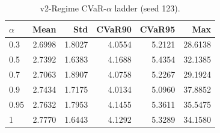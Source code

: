\begin{table}[H]
    \centering
    \caption{v2-Regime CVaR-$\alpha$ ladder (seed 123).}
    \label{tab:v2_regime_alpha}
    \begin{tabular}{@{}lrrrrr@{}}
        \toprule
        $\alpha$ & Mean & Std & CVaR90 & CVaR95 & Max \\
        \midrule
        0.3 & 2.6998 & 1.8027 & 4.0554 & 5.2121 & 28.6138 \\
        0.5 & 2.7392 & 1.6383 & 4.1688 & 5.4354 & 32.1385 \\
        0.7 & 2.7063 & 1.8907 & 4.0758 & 5.2267 & 29.1924 \\
        0.9 & 2.7434 & 1.7175 & 4.0134 & 5.0960 & 37.8852 \\
        0.95 & 2.7632 & 1.7953 & 4.1455 & 5.3611 & 35.5475 \\
        1 & 2.7770 & 1.6443 & 4.1292 & 5.3289 & 34.1580 \\
        \bottomrule
    \end{tabular}
\end{table}
